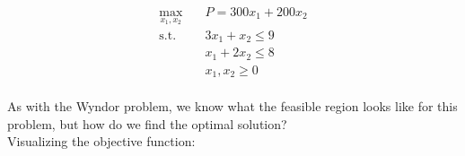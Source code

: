 \documentclass[12pt]{article}
\begin{document}
\begin{equation} \label{dual_SVM}
\begin{aligned}
\max_{x_1,x_2} \quad & P=300x_1+200x_2 \\
\textrm{s.t.} \quad & 3x_1+x_2\leq 9\\ 
& x_1+2x_2\leq 8 \\
& x_1, x_2\geq 0\\
\end{aligned}
\end{equation}

\noindent As with the Wyndor problem, we know what the feasible region looks like for this problem, but how do we find the optimal solution?\\

\noindent Visualizing the objective function:
\end{document}
